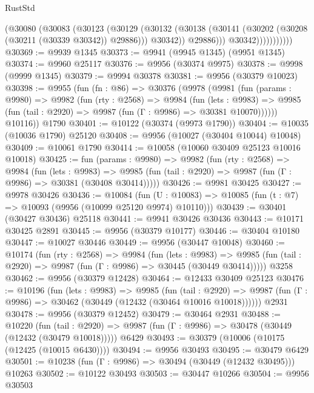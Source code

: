 \begin{lexlean}{RustStd}
\begin{coremodule}
                        (@30080
                          (@30083
                            (@30123
                              (@30129
                                (@30132
                                  (@30138
                                    (@30141 (@30202 (@30208 (@30211 (@30339 @30342)) @29886)))
                                    @30342))
                                @29886)))
                          @30342)))))))))))
@30369 := @9939 @1345
@30373 := @9941 (@9945 @1345) (@9951 @1345)
@30374 := @9960 @25117
@30376 := @9956 (@30374 @9975)
@30378 := @9998 (@9999 @1345)
@30379 := @9994 @30378
@30381 := @9956 (@30379 @10023)
@30398 := @9955
    (fun (fn : @86) =>
    @30376
      (@9978
        (@9981
          (fun (params : @9980) =>
          @9982
            (fun (rty : @2568) =>
            @9984
              (fun (lets : @9983) =>
              @9985 (fun (tail : @2920) => @9987 (fun (Γ : @9986) => @30381 @10070))))))
        @10116))
    @1790
@30401 := @10122 (@30374 (@9973 @1790))
@30404 := @10035 (@10036 @1790) @25120
@30408 := @9956 (@10027 (@30404 @10044) @10048)
@30409 := @10061 @1790
@30414 := @10058 (@10060 @30409 @25123 @10016 @10018)
@30425 := fun (params : @9980) =>
  @9982
    (fun (rty : @2568) =>
    @9984
      (fun (lets : @9983) =>
      @9985 (fun (tail : @2920) => @9987 (fun (Γ : @9986) => @30381 (@30408 @30414)))))
@30426 := @9981 @30425
@30427 := @9978 @30426
@30436 := @10084
    (fun (U : @10083) => @10085 (fun (t : @7) => @10093 (@9956 (@10099 @25120 @9974) @10110)))
@30439 := @30401 (@30427 @30436) @25118
@30441 := @9941 @30426 @30436
@30443 := @10171 @30425 @2891
@30445 := @9956 (@30379 @10177)
@30446 := @30404 @10180
@30447 := @10027 @30446
@30449 := @9956 (@30447 @10048)
@30460 := @10174
    (fun (rty : @2568) =>
    @9984
      (fun (lets : @9983) =>
      @9985 (fun (tail : @2920) => @9987 (fun (Γ : @9986) => @30445 (@30449 @30414)))))
    @3258
@30462 := @9956 (@30379 @12428)
@30464 := @12433 @30409 @25123
@30476 := @10196
    (fun (lets : @9983) =>
    @9985
      (fun (tail : @2920) =>
      @9987 (fun (Γ : @9986) => @30462 (@30449 (@12432 (@30464 @10016 @10018))))))
    @2931
@30478 := @9956 (@30379 @12452)
@30479 := @30464 @2931
@30488 := @10220
    (fun (tail : @2920) => @9987 (fun (Γ : @9986) => @30478 (@30449 (@12432 (@30479 @10018)))))
    @6429
@30493 := @30379 (@10006 (@10175 (@12425 (@10015 @6430))))
@30494 := @9956 @30493
@30495 := @30479 @6429
@30501 := @10238 (fun (Γ : @9986) => @30494 (@30449 (@12432 @30495))) @10263
@30502 := @10122 @30493
@30503 := @30447 @10266
@30504 := @9956 @30503

\end{coremodule}
\end{lexlean}
